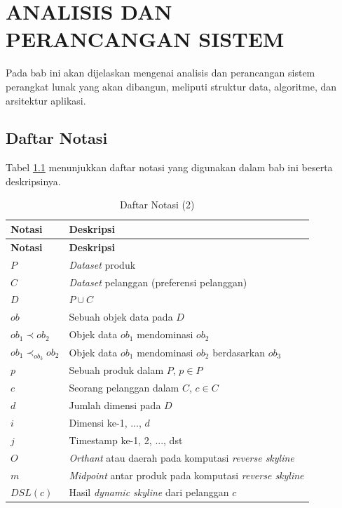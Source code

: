 \chapter{ANALISIS DAN PERANCANGAN SISTEM} \label{chapter:analisis dan perancangan sistem}
\tab Pada bab ini akan dijelaskan mengenai analisis dan perancangan sistem perangkat lunak yang akan dibangun, meliputi struktur data, algoritme, dan arsitektur aplikasi. 

\section{Daftar Notasi}
\tab Tabel \ref{tab:daftar-notasi-2} menunjukkan daftar notasi yang digunakan dalam bab ini beserta deskripsinya.

\begin{longtable}{| p{3cm} | p{7cm} |} 
	\caption{Daftar Notasi (2) \label{tab:daftar-notasi-2}}\\
	\hline
	\multicolumn{1}{|p{3cm}|}{\textbf{Notasi}} & \multicolumn{1}{|p{7cm}|}{\textbf{Deskripsi}}\\ \hline
	\hline
	\endfirsthead
	\hline
	\multicolumn{1}{|p{3cm}|}{\textbf{Notasi}} & \multicolumn{1}{|p{7cm}|}{\textbf{Deskripsi}}\\ \hline 
	\endhead
	$P$ & \textit{Dataset} produk\\ \hline
	$C$ & \textit{Dataset} pelanggan (preferensi pelanggan)\\ \hline
	$D$ & $P \cup C$ \\ \hline
	$ob$ & Sebuah objek data pada $D$\\ \hline
	$ob_1 \prec ob_2$ & Objek data $ob_1$ mendominasi $ob_2$\\ \hline
	$ob_1 \prec_{ob_3} ob_2$ & Objek data $ob_1$ mendominasi $ob_2$ berdasarkan $ob_3$\\ \hline
	$p$ & Sebuah produk dalam $P$, $p \in P$\\ \hline
	$c$ & Seorang pelanggan dalam $C$, $c \in C$\\ \hline
	$d$ & Jumlah dimensi pada $D$\\ \hline
	$i$ & Dimensi ke-1, ..., $d$\\ \hline
	$j$ & Timestamp ke-1, 2, ..., dst\\ \hline
	$O$ & \textit{Orthant} atau daerah pada komputasi \textit{reverse skyline}\\ \hline
	$m$ & \textit{Midpoint} antar produk pada komputasi \textit{reverse skyline}\\ \hline
	$DSL(c)$ & Hasil \textit{dynamic skyline} dari pelanggan $c$\\ \hline

\end{longtable}
